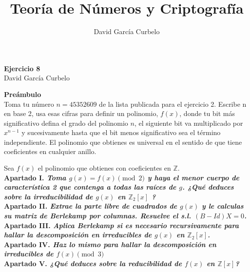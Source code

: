\documentclass[fleqn]{article}
\author{David García Curbelo}
\title{Teoría de Números y Criptografía}
\def\Z{\mathds{Z}}
\begin{document}
    \begin{center}
        \LARGE{\textbf{Ejercicio 8}} \\
        \Large{David García Curbelo} \\
    \end{center}

    \vspace{1cm}

    \textbf{Preámbulo} \\
    Toma tu número $n=45352609$ de la lista publicada para el ejercicio 2.
    Escribe n en base 2, usa esas cifras para definir un polinomio, $f(x)$, donde tu bit más significativo
    defina el grado del polinomio $n$, el siguiente bit va multiplicado por $x^{n-1}$ y sucesivamente hasta 
    que el bit menos significativo sea el término independiente. El polinomio que obtienes es universal en el
    sentido de que tiene coeficientes en cualquier anillo.

    \newpage
    Sea $f(x)$ el polinomio que obtienes con coeficientes en $\Z$.\\ 

    \textbf{Apartado I. \textit{Toma $g(x) = f(x) \pmod{2}$ y haya el menor cuerpo de característica 2 que contenga
                                a todas las raíces de $g$. ¿Qué deduces sobre la irreducibilidad de $g(x)$ en $\Z_2[x]$ ?}}\\
    

    \newpage
    \textbf{Apartado II. \textit{Extrae la parte libre de cuadrados de $g(x)$ y le calculas su matriz de Berlekamp por
                                columnas. Resuelve el s.l. $(B - Id)X = 0$.}}\\

    \newpage
    \textbf{Apartado III. \textit{Aplica Berlekamp si es necesario recursivamente para hallar la descomposición en irreducibles de $g(x)$ en $\Z_2[x]$.}} \\


    \newpage
    \textbf{Apartado IV. \textit{Haz lo mismo para hallar la descomposición en irreducibles de $f(x) \pmod{3}$}}\\
    \newpage
    \textbf{Apartado V. \textit{¿Qué deduces sobre la reducibilidad de $f(x)$ en $\Z[x]$?}}\\
\end{document}
